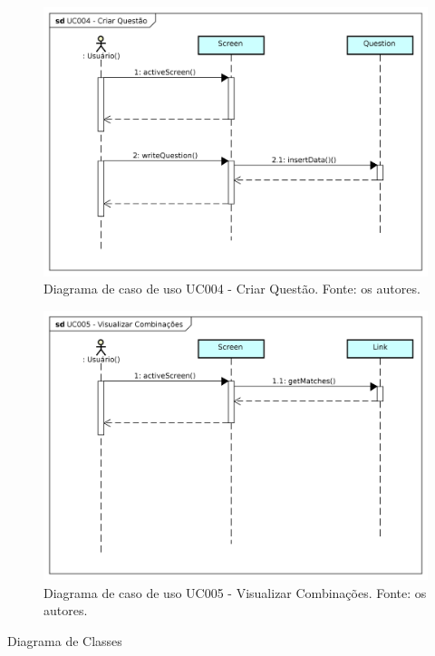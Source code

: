 \begin{figure}[!htb]
\centering
\includegraphics[width=16cm]{UC004-CriarQuestao.png}
\caption{Diagrama de caso de uso UC004 - Criar Questão. Fonte: os autores.}
\label{fig:UC004}
\end{figure}


\begin{figure}[!htb]
\centering
\includegraphics[width=16cm]{UC005-VisualizarCombinacoes.png}
\caption{Diagrama de caso de uso UC005 - Visualizar Combinações. Fonte: os autores.}
\label{fig:UC005}
\end{figure}


Diagrama de Classes

